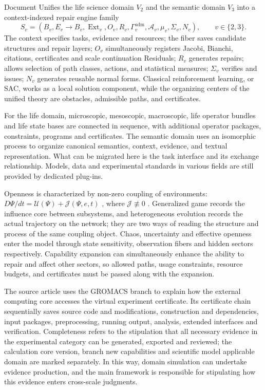 \documentclass[11pt,a4paper]{article}
\theoremstyle{plain}
\theoremstyle{definition}
\theoremstyle{remark}
\begin{document}
\begin{CJK*}
Document \cite{S25} Unifies the life science domain $V_2$ and the semantic domain $V_3$ into a context-indexed repair engine family \[
 S_v=(B_v,E_v\to B_v,\operatorname{Ext}_v,O_v,R_v,
      \Gamma_v^{\mathrm{adm}},\mathcal A_v,\mu_v,\Sigma_v,N_v),
 \qquad v\in\{2,3\}.
\] The context specifies tasks, evidence and resources; the fiber saves candidate structures and repair layers; $O_v$ simultaneously registers Jacobi, Bianchi, citations, certificates and scale continuation Residuals; $R_v$ generates repairs; allows selection of path classes, actions, and statistical measures; $\Sigma_v$ verifies and issues; $N_v$ generates reusable normal forms. Classical reinforcement learning, or SAC, works as a local solution component, while the organizing centers of the unified theory are obstacles, admissible paths, and certificates.

For the life domain, microscopic, mesoscopic, macroscopic, life operator bundles and life state bases are connected in sequence, with additional operator packages, constraints, programs and certificates. The semantic domain uses an isomorphic process to organize canonical semantics, context, evidence, and textual representation. What can be migrated here is the task interface and its exchange relationship. Models, data and experimental standards in various fields are still provided by dedicated plug-ins.

Openness is characterized by non-zero coupling of environments: $D\Psi/dt=\mathcal U(\Psi)+\mathcal J(\Psi,e,t)$ , where $\mathcal J\not\equiv0$ . Generalized game records the influence core between subsystems, and heterogeneous evolution records the actual trajectory on the network; they are two ways of reading the structure and process of the same coupling object. Chaos, uncertainty and effective openness enter the model through state sensitivity, observation fibers and hidden sectors respectively. Capability expansion can simultaneously enhance the ability to repair and affect other sectors, so allowed paths, usage constraints, resource budgets, and certificates must be passed along with the expansion.

The source article uses the GROMACS branch to explain how the external computing core accesses the virtual experiment certificate. Its certificate chain sequentially saves source code and modifications, construction and dependencies, input packages, preprocessing, running output, analysis, extended interfaces and verification. Completeness refers to the stipulation that all necessary evidence in the experimental category can be generated, exported and reviewed; the calculation core version, branch new capabilities and scientific model applicable domain are marked separately. In this way, domain simulation can undertake evidence production, and the main framework is responsible for stipulating how this evidence enters cross-scale judgments.


\end{CJK*}
\end{document}
